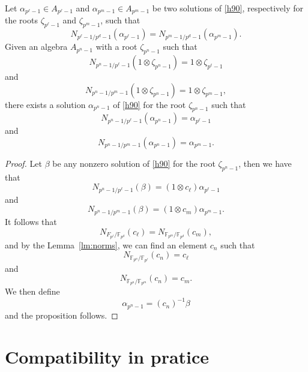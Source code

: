 \documentclass[a4paper,11pt]{article}
\begin{document}
\begin{prop}
  Let $\alpha_{p^\ell-1}\in A_{p^\ell-1}$ and $\alpha_{p^m-1}\in A_{p^m-1}$ be
  two solutions of \eqref{h90}, respectively for the roots $\zeta_{p^\ell-1}$ and
  $\zeta_{p^m-1}$, such that
  \[
    N_{p^\ell-1/p^d-1}(\alpha_{p^\ell-1})=N_{p^m-1/p^d-1}(\alpha_{p^m-1}).
  \]
  Given an algebra $A_{p^n-1}$ with a root $\zeta_{p^n-1}$ such that 
  \[
    N_{p^n-1/p^\ell-1}(1\otimes\zeta_{p^n-1})=1\otimes\zeta_{p^\ell-1}
  \]
  and
  \[
    N_{p^n-1/p^m-1}(1\otimes\zeta_{p^n-1})=1\otimes\zeta_{p^m-1},
  \]
  there exists a solution $\alpha_{p^n-1}$ of \eqref{h90} for the root $\zeta_{p^n-1}$ such that
  \[
    N_{p^n-1/p^\ell-1}(\alpha_{p^n-1})=\alpha_{p^\ell-1}
  \]
  and
  \[
    N_{p^n-1/p^m-1}(\alpha_{p^n-1})=\alpha_{p^m-1}.
  \]
\end{prop}
\begin{proof}
  Let $\beta$ be any nonzero solution of \eqref{h90} for the root
  $\zeta_{p^n-1}$, then we have that
  \[
    N_{p^n-1/p^\ell-1}(\beta)=(1\otimes c_\ell)\alpha_{p^\ell-1}
  \]
  and
  \[
    N_{p^n-1/p^m-1}(\beta)=(1\otimes c_m)\alpha_{p^m-1}.
  \]
  It follows that 
  \[
    N_{F_{p^\ell}/\mathbb{F}_{p^d}}(c_\ell)=N_{\mathbb{F}_{p^m}/\mathbb{F}_{p^d}}(c_m),
  \]
  and by the Lemma~\ref{lm:norms}, we can find an element $c_n$ such that
  \[
    N_{\mathbb{F}_{p^n}/\mathbb{F}_{p^\ell}}(c_n) = c_\ell
  \]
  and
  \[
    N_{\mathbb{F}_{p^n}/\mathbb{F}_{p^m}}(c_n)=c_m.
  \]
 We then define 
 \[
   \alpha_{p^n-1}=(c_n)^{-1}\beta
 \]
 and the proposition follows.

\end{proof}

\section{Compatibility in pratice}
\label{sec:practice}
\end{document}
